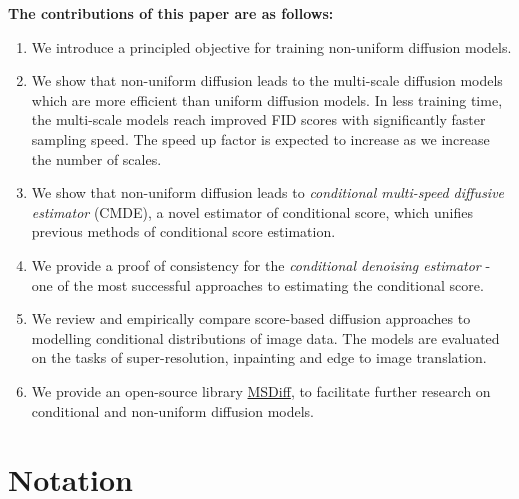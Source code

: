\noindent
\textbf{The contributions of this paper are as follows:}
\begin{enumerate}
    \item We introduce a principled objective for training non-uniform diffusion models.
    \item We show that non-uniform diffusion leads to the multi-scale diffusion models which are more efficient than uniform diffusion models. In less training time, the multi-scale models reach improved FID scores with significantly faster sampling speed. The speed up factor is expected to increase as we increase the number of scales.
    \item We show that non-uniform diffusion leads to \textit{conditional multi-speed diffusive estimator} (CMDE), a novel estimator of conditional score, which unifies previous methods of conditional score estimation.
    \item We provide a proof of consistency for the \textit{conditional denoising estimator} - one of the most successful approaches to estimating the conditional score. 
    
    \item We review and empirically compare score-based diffusion  approaches to modelling conditional distributions of image data. The models are evaluated on the tasks of super-resolution, inpainting and edge to image translation.

    \item We provide an open-source library \href{https://github.com/GBATZOLIS/conditional_score_diffusion}{MSDiff}, to facilitate further research on conditional and non-uniform diffusion models.
\end{enumerate}

\section{Notation}

